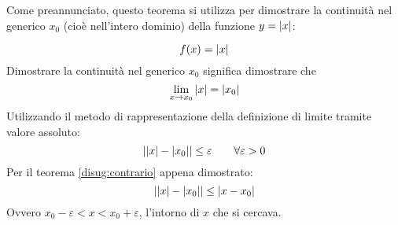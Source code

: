 Come preannunciato, questo teorema si utilizza per dimostrare la continuità nel generico $x_0$ (cioè nell'intero dominio) della funzione $y=\left\lvert x \right\rvert$:
\begin{examp}
	\[
		f(x)=\left\lvert x \right\rvert
	\]
	Dimostrare la continuità nel generico $x_0$ significa dimostrare che
	\[
		\lim_{x\to x_0}\left\lvert x \right\rvert=\left\lvert x_0 \right\rvert
	\]
	Utilizzando il metodo di rappresentazione della definizione di limite tramite valore assoluto:
	\[
		\left\lvert \left\lvert x \right\rvert-\left\lvert x_0 \right\rvert \right\rvert\leq\varepsilon\qquad\forall\varepsilon>0
	\]
	Per il teorema \ref{disug:contrario} appena dimostrato:
	\[
		\left\lvert \left\lvert x \right\rvert-\left\lvert x_0 \right\rvert \right\rvert\leq\left\lvert x-x_0 \right\rvert
	\]
	Ovvero $x_0-\varepsilon<x<x_0+\varepsilon$, l'intorno di $x$ che si cercava.
\end{examp}
